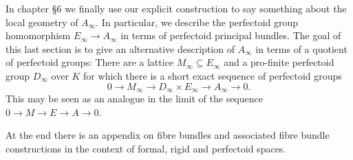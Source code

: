 \documentclass[10pt,oneside]{amsart}
\theoremstyle{definition}
\newtheorem{question}[mainthm]{Question}
\newtheorem*{example}{Example}
\begin{document}
In chapter \S6 we finally use our explicit construction to say something about the local geometry of $A_\infty$. In particular, we describe the perfectoid group homomorphism $E_\infty \rightarrow A_\infty$ in terms of perfectoid principal bundles. The goal of this last section is to give an alternative description of $A_\infty$ in terms of a quotient of perfectoid groups: There are a lattice $M_{\infty}\subseteq E_\infty$ and a pro-finite perfectoid group $D_\infty$ over $K$ for which there is a short exact sequence of perfectoid groups
\[0\rightarrow M_\infty\rightarrow D_\infty \times E_\infty \rightarrow A_\infty\rightarrow 0.\]
This may be seen as an analogue in the limit of the sequence $0\rightarrow M\rightarrow E\rightarrow A\rightarrow 0$.

At the end there is an appendix on fibre bundles and associated fibre bundle constructions in the context of formal, rigid and perfectoid spaces.

 \begin{comment}
Now we end the introduction by describing the content of each section. 

	\begin{question} \label{question_intro}
	    \begin{enumerate} 
	    \item		Given a rigid group $G$, when is there an adic space $G_\infty$ such that $G_\infty \sim  \varprojlim_{[p]} G ?$
	    \item If it exists, and $K$ is perfectoid, when is $G_\infty$ perfectoid?
	    \end{enumerate}
	\end{question}
 
 
	But before we give proofs for examples of rigid groups $G$ for which a perfectoid tilde-limit exists, we first note that the second question certainly doesn't have an affirmative answer for all rigid group varieties:
	\begin{example}
		For the additive group $\mathbb G_a^{\operatorname{an}}$, we know that $[p]$ is an isomorphism and therefore $\varprojlim_{[p]} \mathbb G_a=\mathbb G_a$ exists (even as an actual limit in the category of adic spaces) but is certainly not perfectoid.
	\end{example}

\end{comment} 
 
 
 
\end{document}
